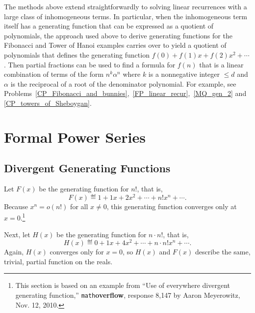 The methods above extend straightforwardly to solving linear
recurrences with a large class of inhomogeneous terms.  In particular,
when the inhomogeneous term itself has a generating function that can
be expressed as a quotient of polynomials, the approach used above to
derive generating functions for the Fibonacci and Tower of Hanoi
examples carries over to yield a quotient of polynomials that defines
the generating function $f(0)+f(1)x+f(2)x^2+\cdots$.  Then partial
fractions can be used to find a formula for $f(n)$ that is a linear
combination of terms of the form $n^k\alpha^n$ where $k$ is a
nonnegative integer $\leq d$ and $\alpha$ is the reciprocal of a
root of the denominator polynomial.  For example, see
Problems~\ref{CP_Fibonacci_and_bunnies},~\ref{FP_linear_recur},~\ref{MQ_gen_2} and
\ref{CP_towers_of_Sheboygan}.

\begin{problems}
\practiceproblems
{}

\classproblems
{}

\homeworkproblems
{}

\examproblems
{}

\end{problems}

\section{Formal Power Series}\label{sec:power_series}

\subsection{Divergent Generating Functions}
Let $F(x)$ be the generating function for $n!$, that is,
\[
F(x) \eqdef 1 + 1x + 2x^2 + \cdots + n! x^n + \cdots.
\]
Because $x^n = o(n!)$ for all $x \neq 0$, this generating function
converges only at $x=0$.\footnote{This section is based on an example
from ``Use of everywhere divergent generating
function,'' \texttt{math}\textbf{overflow}, response 8,147 by Aaron
Meyerowitz, Nov. 12, 2010.}

Next, let $H(x)$ be the generating function for $n
\cdot n!$, that is, 
\[
H(x) \eqdef 0 + 1x + 4x^2 + \cdots + n\cdot n! x^n + \cdots.
\]
Again, $H(x)$ converges only for $x = 0$, so $H(x)$ and $F(x)$
  describe the same, trivial, partial function on the reals.

